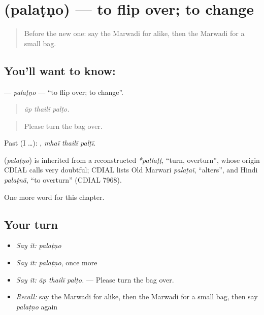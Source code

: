 \section[\texorpdfstring{\mw{पलटणो} (palaṭṇo)}{पलटणो (palaṭṇo)}]{ (palaṭṇo) — to flip over; to change}

\label{lesson:MW-C214-palatno}



\begin{quote}
Before the new one: say the Marwadi for alike, then the Marwadi for a small bag.
\end{quote}

\subsection*{You'll want to know: }
\textbf{} — \emph{palaṭṇo} — \textquotedblleft{}to flip over; to change\textquotedblright{}.

\begin{quote}
  
\end{quote}

\begin{quote}
\emph{āp thailī palṭo.}
\end{quote}

\begin{quote}
Please turn the bag over.
\end{quote}

Past (I …):   , \emph{mhaĩ thailī palṭī}.

\begin{cousinweb}
\textbf{} (\emph{palaṭṇo}) is inherited from a reconstructed \emph{*pallaṭṭ}, \textquotedblleft{}turn, overturn\textquotedblright{}, whose origin CDIAL calls very doubtful; CDIAL lists Old Marwari \emph{palaṭaï}, \textquotedblleft{}alters\textquotedblright{}, and Hindi \emph{palaṭnā}, \textquotedblleft{}to overturn\textquotedblright{} (CDIAL 7968).
\end{cousinweb}

\begin{grammarlens}[title={What you've built}]
One more word for this chapter.
\end{grammarlens}

\subsection*{Your turn}
\begin{itemize}
\raggedright
  \item \emph{Say it:} \emph{palaṭṇo}
  \item \emph{Say it:} \emph{palaṭṇo}, once more
  \item \emph{Say it:} \emph{āp thailī palṭo.} — Please turn the bag over.
  \item \emph{Recall:} say the Marwadi for alike, then the Marwadi for a small bag, then say \emph{palaṭṇo} again
\end{itemize}

